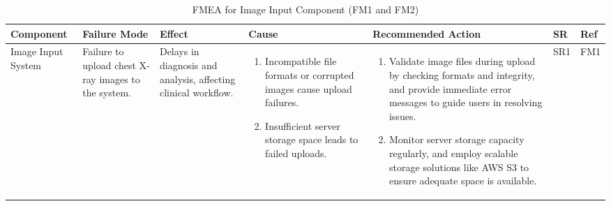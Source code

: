 \documentclass{article}
\begin{document}
\begin{landscape}
    \begin{table}[ht]
    \centering
    \caption{FMEA for Image Input Component (FM1 and FM2)}
    \renewcommand{\arraystretch}{1.1}
    {
    \setlength{\tabcolsep}{2pt}
    \begin{tabular}{|p{2.5cm}|p{2.5cm}|p{3cm}|p{5cm}|p{6cm}|p{1cm}|p{1cm}|}
    \hline
    \textbf{Component} & \textbf{Failure Mode} & \textbf{Effect} & \textbf{Cause} & \textbf{Recommended Action} & \textbf{SR} & \textbf{Ref} \\
    \hline

    Image Input System
     & Failure to upload chest X-ray images to the system.
     & Delays in diagnosis and analysis, affecting clinical workflow.
     &
     \begin{enumerate}[leftmargin=*, label={\alph*.}, itemsep=1pt]
         \item Incompatible file formats or corrupted images cause upload failures.
         \item Insufficient server storage space leads to failed uploads.
     \end{enumerate}
     &
     \begin{enumerate}[leftmargin=*, label={\alph*.}, itemsep=1pt]
         \item Validate image files during upload by checking formats and integrity, and provide immediate error messages to guide users in resolving issues.
         \item Monitor server storage capacity regularly, and employ scalable storage solutions like AWS S3 to ensure adequate space is available.
     \end{enumerate}
     & SR1 & FM1 \\ \hline


\end{tabular}}
\end{table}
\end{landscape}
\end{document}
